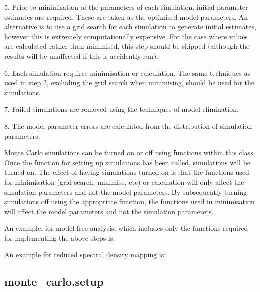 5.  Prior to minimisation of the parameters of each simulation, initial parameter estimates
are required.  These are taken as the optimised model parameters.  An alternative is to use
a grid search for each simulation to generate initial estimates, however this is extremely
computationally expensive.  For the case where values are calculated rather than minimised,
this step should be skipped (although the results will be unaffected if this is accidently
run).

6.  Each simulation requires minimisation or calculation.  The same techniques as used in
step 2, excluding the grid search when minimising, should be used for the simulations.

7.  Failed simulations are removed using the techniques of model elimination.

8.  The model parameter errors are calculated from the distribution of simulation
parameters.


Monte Carlo simulations can be turned on or off using functions within this class.  Once the
function for setting up simulations has been called, simulations will be turned on.  The
effect of having simulations turned on is that the functions used for minimisation (grid
search, minimise, etc) or calculation will only affect the simulation parameters and not the
model parameters.  By subsequently turning simulations off using the appropriate function,
the functions used in minimisation will affect the model parameters and not the simulation
parameters.


An example, for model-free analysis, which includes only the functions required for
implementing the above steps is:




An example for reduced spectral density mapping is:





\newpage

\subsection{monte\_carlo.setup}


